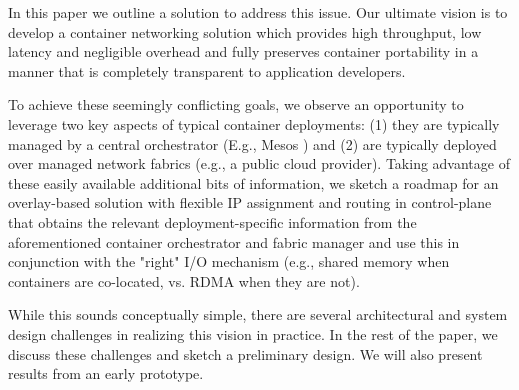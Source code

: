 In this paper we outline a solution to address this issue.  Our ultimate vision
is to develop a container networking solution which provides high throughput,
low latency and negligible overhead and fully preserves container portability in
a manner that is completely transparent to application developers. 

To achieve these seemingly conflicting goals, we observe an opportunity to
leverage two key aspects of typical container deployments: (1) they are
typically managed by a central orchestrator (E.g., Mesos \cite{mesos} ) and (2) are typically
deployed over managed network fabrics (e.g., a public cloud provider). Taking
advantage of these easily available additional bits of information, we sketch a
roadmap for an overlay-based solution  with flexible IP assignment and routing
in control-plane  that obtains the relevant
deployment-specific information from the aforementioned container orchestrator
and fabric manager and use this in conjunction with the "right" I/O mechanism
(e.g., shared memory when containers are co-located, vs. RDMA when they are
not). 

While this sounds conceptually simple, there are several architectural
and system design challenges in realizing this vision in practice. In the rest
of the paper, we discuss these challenges and sketch a preliminary design. We
will also present results from an early prototype.
